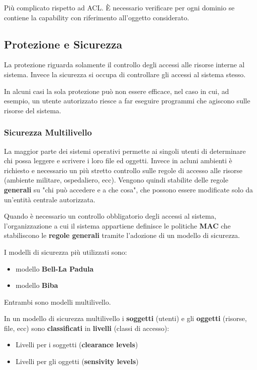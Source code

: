 \documentclass{article}
\begin{document}
Più complicato rispetto ad ACL. È necessario verificare per ogni dominio se contiene la capability con riferimento all'oggetto considerato.

\subsection{Protezione e Sicurezza}

La protezione riguarda solamente il controllo degli accessi alle risorse interne al sistema. Invece la sicurezza si occupa di controllare gli accessi al sistema stesso.

In alcuni casi la sola protezione può non essere efficace, nel caso in cui, ad esempio, un utente autorizzato riesce a far eseguire programmi che agiscono sulle
risorse del sistema.

\subsubsection{Sicurezza Multilivello}

La maggior parte dei sistemi operativi permette ai singoli utenti di determinare chi possa leggere e scrivere i loro file ed oggetti. Invece in acluni ambienti
è richiesto e necessario un più stretto controllo sulle regole di accesso alle risorse (ambiente militare, ospedaliero, ecc). Vengono quindi stabilite delle regole
\textbf{generali} su "chi può accedere e a che cosa", che possono essere modificate solo da un'entità centrale autorizzata.

Quando è necessario un controllo obbligatorio degli accessi al sistema, l'organizzazione a cui il sistema appartiene definisce le politiche \textbf{MAC} che
stabiliscono le \textbf{regole generali} tramite l'adozione di un modello di sicurezza.

\vspace{3mm}
I modelli di sicurezza più utilizzati sono:
\begin{itemize}
    \item modello \textbf{Bell-La Padula}
    \item modello \textbf{Biba}
\end{itemize}

Entrambi sono modelli multilivello.

\vspace{3mm}
In un modello di sicurezza multilivello i \textbf{soggetti} (utenti) e gli \textbf{oggetti} (risorse, file, ecc) sono \textbf{classificati} in \textbf{livelli} (classi
di accesso):
\begin{itemize}
    \item Livelli per i soggetti (\textbf{clearance levels})
    \item Livelli per gli oggetti (\textbf{sensivity levels})
\end{itemize}
\end{document}
